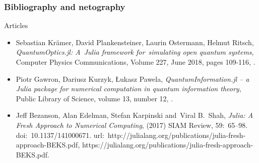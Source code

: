 \documentclass[10pt,t]{beamer}
\begin{document}
\begin{frame}
  \frametitle{Bibliography and netography}


  Articles
  \begin{itemize}
    \RaggedRight

  \item Sebastian Kr\"{a}mer, David Plankensteiner, Laurin
    Ostermann, Helmut Ritsch, \textit{QuantumOptics.jl: A~Julia
      framework for~simulating open quantum systems}, Computer
    Physics Communications, Volume 227, June 2018, pages 109-116,
    .

  \item Piotr Gawron, Dariusz Kurzyk, Łukasz Pawela,
    \textit{QuantumInformation.jl -- a Julia package for numerical
      computation in quantum information theory}, Public Library of
    Science, volume 13, number 12,
    .

  \item Jeff Bezanson, Alan Edelman, Stefan Karpinski and~Viral
    B.~Shah, \textit{Julia: A Fresh Approach to Numerical Computing},
    (2017) SIAM Review, 59:~65--98. doi:~10.1137/141000671.
    url:~http://julialang.org/publications/julia-fresh-approach-BEKS.pdf,
    {https://julialang.org/publications/julia-fresh-approach-BEKS.pdf}.

  \end{itemize}

\end{frame}
\end{document}
